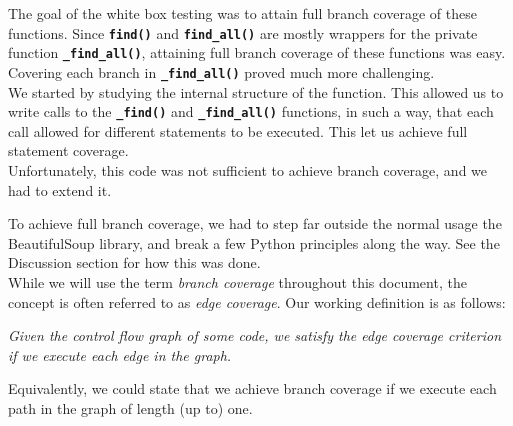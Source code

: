 \documentclass[10pt]{article}
\newcommand{\tbt}[1]{\texttt{\textbf{#1}}}
\begin{document}
The goal of the white box testing was to attain full branch coverage of these functions. Since \texttt{\textbf{find()}} and \texttt{\textbf{find\_all()}} are mostly wrappers for the private function \texttt{\textbf{\_find\_all()}}, attaining full branch coverage of these functions was easy. Covering each branch in \texttt{\textbf{\_find\_all()}} proved much more challenging. \\

We started by studying the internal structure of the function. This allowed us to write calls to the \tbt{\_find()} and \tbt{\_find\_all()} functions, in such a way, that each call allowed for different statements to be executed. This let us achieve full statement coverage. \\

Unfortunately, this code was not sufficient to achieve branch coverage, and we had to extend it.

To achieve full branch coverage, we had to step far outside the normal usage the BeautifulSoup library, and break a few Python principles along the way. See the Discussion section for how this was done. \\

While we will use the term \textit{branch coverage} throughout this document, the concept is often referred to as \textit{edge coverage}. Our working definition is as follows: 

\begin{center}
  \textit{Given the control flow graph of some code, we satisfy the edge coverage criterion if we execute each edge in the graph.}
\end{center} 

Equivalently, we could state that we achieve branch coverage if we execute each path in the graph of length (up to) one.
\end{document}
